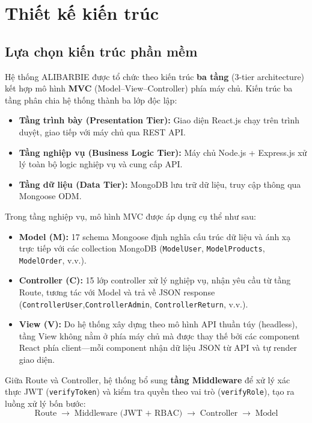 \documentclass[../DoAn.tex]{subfiles}
\begin{document}
\section{Thiết kế kiến trúc}
\label{section:4.1}

\subsection{Lựa chọn kiến trúc phần mềm}
\label{subsection:4.1.1}

Hệ thống ALIBARBIE được tổ chức theo kiến trúc \textbf{ba tầng} (3-tier
architecture) kết hợp mô hình \textbf{MVC} (Model--View--Controller) phía máy
chủ. Kiến trúc ba tầng phân chia hệ thống thành ba lớp độc lập:

\begin{itemize}
  \item \textbf{Tầng trình bày (Presentation Tier):} Giao diện React.js chạy
        trên trình duyệt, giao tiếp với máy chủ qua REST API.
  \item \textbf{Tầng nghiệp vụ (Business Logic Tier):} Máy chủ Node.js +
        Express.js xử lý toàn bộ logic nghiệp vụ và cung cấp API.
  \item \textbf{Tầng dữ liệu (Data Tier):} MongoDB lưu trữ dữ liệu, truy cập
        thông qua Mongoose ODM.
\end{itemize}

Trong tầng nghiệp vụ, mô hình MVC được áp dụng cụ thể như sau:

\begin{itemize}
  \item \textbf{Model (M):} 17 schema Mongoose định nghĩa cấu trúc dữ liệu và
        ánh xạ trực tiếp với các collection MongoDB (\texttt{ModelUser},
        \texttt{ModelProducts}, \break \texttt{ModelOrder}, v.v.).
  \item \textbf{Controller (C):} 15 lớp controller xử lý nghiệp vụ, nhận yêu
        cầu từ tầng Route, tương tác với Model và trả về JSON response
        (\texttt{ControllerUser},\break \texttt{ControllerAdmin},
        \texttt{ControllerReturn}, v.v.).
  \item \textbf{View (V):} Do hệ thống xây dựng theo mô hình API thuần túy
        (headless), tầng View không nằm ở phía máy chủ mà được thay thế bởi
        các component React phía client---mỗi component nhận dữ liệu JSON từ
        API và tự render giao diện.
\end{itemize}

Giữa Route và Controller, hệ thống bổ sung \textbf{tầng Middleware} để xử lý
xác thực JWT (\texttt{verifyToken}) và kiểm tra quyền theo vai trò
(\texttt{verifyRole}), tạo ra luồng xử lý bốn bước:
\[
  \text{Route} \;\longrightarrow\; \text{Middleware (JWT + RBAC)} \;\longrightarrow\;
  \text{Controller} \;\longrightarrow\; \text{Model}
\]
\end{document}
